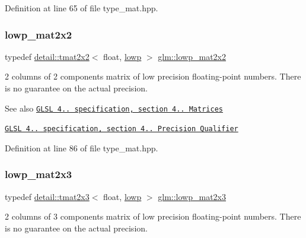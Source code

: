 Definition at line 65 of file type\+\_\+mat.\+hpp.

\mbox{\label{group__core__precision_ga7d7e123d953978cc17de6882bb10400e}} 
\subsubsection{\texorpdfstring{lowp\+\_\+mat2x2}{lowp\_mat2x2}}
{\footnotesize\ttfamily typedef \hyperlink{structglm_1_1detail_1_1tmat2x2}{detail\+::tmat2x2}$<$ float, \hyperlink{namespaceglm_a0f04f086094c747d227af4425893f545ae161af3fc695e696ce3bf69f7332bc2d}{lowp} $>$ \hyperlink{group__core__precision_ga7d7e123d953978cc17de6882bb10400e}{glm\+::lowp\+\_\+mat2x2}}

2 columns of 2 components matrix of low precision floating-\/point numbers. There is no guarantee on the actual precision.

\begin{DoxySeeAlso}{See also}
\href{http://www.opengl.org/registry/doc/GLSLangSpec.4.20.8.pdf}{\tt G\+L\+SL 4.. specification, section 4.. Matrices} 

\href{http://www.opengl.org/registry/doc/GLSLangSpec.4.20.8.pdf}{\tt G\+L\+SL 4.. specification, section 4.. Precision Qualifier} 
\end{DoxySeeAlso}


Definition at line 86 of file type\+\_\+mat.\+hpp.

\mbox{\label{group__core__precision_gaef481e637af5103a83ab561d30d28f2a}} 
\subsubsection{\texorpdfstring{lowp\+\_\+mat2x3}{lowp\_mat2x3}}
{\footnotesize\ttfamily typedef \hyperlink{structglm_1_1detail_1_1tmat2x3}{detail\+::tmat2x3}$<$ float, \hyperlink{namespaceglm_a0f04f086094c747d227af4425893f545ae161af3fc695e696ce3bf69f7332bc2d}{lowp} $>$ \hyperlink{group__core__precision_gaef481e637af5103a83ab561d30d28f2a}{glm\+::lowp\+\_\+mat2x3}}

2 columns of 3 components matrix of low precision floating-\/point numbers. There is no guarantee on the actual precision.

